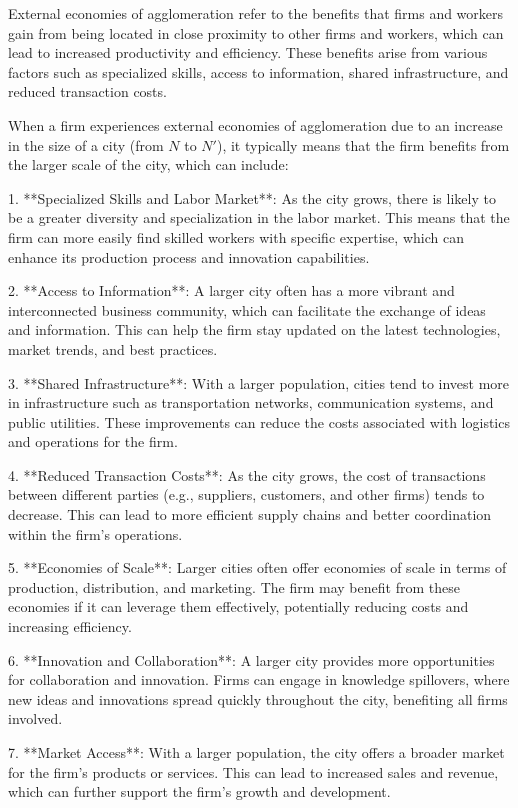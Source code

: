 External economies of agglomeration refer to the benefits that firms and workers gain from being located in close proximity to other firms and workers, which can lead to increased productivity and efficiency. These benefits arise from various factors such as specialized skills, access to information, shared infrastructure, and reduced transaction costs.

When a firm experiences external economies of agglomeration due to an increase in the size of a city (from \( N \) to \( N' \)), it typically means that the firm benefits from the larger scale of the city, which can include:

1. **Specialized Skills and Labor Market**: As the city grows, there is likely to be a greater diversity and specialization in the labor market. This means that the firm can more easily find skilled workers with specific expertise, which can enhance its production process and innovation capabilities.

2. **Access to Information**: A larger city often has a more vibrant and interconnected business community, which can facilitate the exchange of ideas and information. This can help the firm stay updated on the latest technologies, market trends, and best practices.

3. **Shared Infrastructure**: With a larger population, cities tend to invest more in infrastructure such as transportation networks, communication systems, and public utilities. These improvements can reduce the costs associated with logistics and operations for the firm.

4. **Reduced Transaction Costs**: As the city grows, the cost of transactions between different parties (e.g., suppliers, customers, and other firms) tends to decrease. This can lead to more efficient supply chains and better coordination within the firm's operations.

5. **Economies of Scale**: Larger cities often offer economies of scale in terms of production, distribution, and marketing. The firm may benefit from these economies if it can leverage them effectively, potentially reducing costs and increasing efficiency.

6. **Innovation and Collaboration**: A larger city provides more opportunities for collaboration and innovation. Firms can engage in knowledge spillovers, where new ideas and innovations spread quickly throughout the city, benefiting all firms involved.

7. **Market Access**: With a larger population, the city offers a broader market for the firm's products or services. This can lead to increased sales and revenue, which can further support the firm's growth and development.

